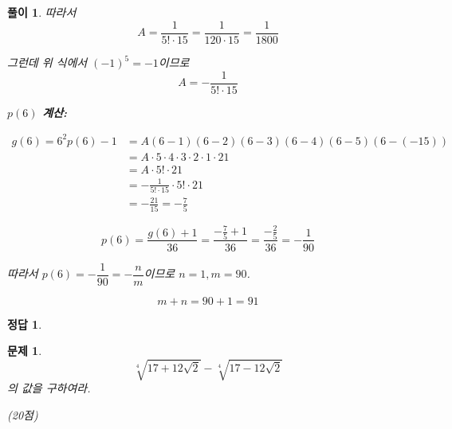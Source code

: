 \documentclass[12pt,a4paper]{article}
\theoremstyle{test_form}
\newtheorem{problem}{문제}[section]
\newtheorem*{solution}{풀이}
\newtheorem*{answer}{정답}
\begin{document}
\begin{solution}
따라서
\[
A = \frac{1}{5! \cdot 15} = \frac{1}{120 \cdot 15} = \frac{1}{1800}
\]

그런데 위 식에서 \((-1)^5 = -1\)이므로
\[
A = -\frac{1}{5! \cdot 15}
\]

\textbf{\(p(6)\) 계산:}

\[
\begin{aligned}
g(6) = 6^2 p(6) - 1 &= A(6-1)(6-2)(6-3)(6-4)(6-5)(6-(-15)) \\
&= A \cdot 5 \cdot 4 \cdot 3 \cdot 2 \cdot 1 \cdot 21 \\
&= A \cdot 5! \cdot 21 \\
&= -\frac{1}{5! \cdot 15} \cdot 5! \cdot 21 \\
&= -\frac{21}{15} = -\frac{7}{5}
\end{aligned}
\]

\[
p(6) = \frac{g(6) + 1}{36} = \frac{-\frac{7}{5} + 1}{36} = \frac{-\frac{2}{5}}{36} = -\frac{1}{90}
\]

따라서 \(p(6) = -\dfrac{1}{90} = -\dfrac{n}{m}\)이므로 \(n = 1, m = 90\).

\[
m + n = 90 + 1 = 91
\]

\end{solution}

\begin{answer}
\hfill {}
\end{answer}

\newpage

\begin{problem}

\[
\sqrt[4]{17 + 12\sqrt{2}} - \sqrt[4]{17 - 12\sqrt{2}}
\]
의 값을 구하여라.

\begin{flushright}(20점)\end{flushright}

\end{problem}
\end{document}
